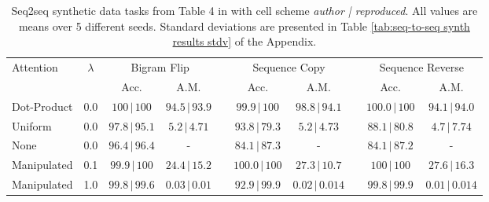 \begin{table}[]
    \caption{Seq2seq synthetic data tasks from Table 4 in \citet{pruthi-etal-2020-learning} with cell scheme \textit{author | reproduced}. All values are means over 5 different seeds. Standard deviations are presented in Table \ref{tab:seq-to-seq synth results stdv} of the Appendix.}
    \label{tab:Authors seq-to-seq synth results}
    \centering
    \begin{tabular}{lccccccccc}
    \toprule
Attention & $\lambda$ & \multicolumn{2}{c}{Bigram Flip} &  & \multicolumn{2}{c}{Sequence Copy} &  & \multicolumn{2}{c}{Sequence Reverse} \\ \cline{3-4} \cline{6-7} \cline{9-10}
                           &                        & \multicolumn{1}{c}{Acc.}           & \multicolumn{1}{c}{A.M.}           &  & \multicolumn{1}{c}{Acc.}            & \multicolumn{1}{c}{A.M.}            &  & \multicolumn{1}{c}{Acc.}              & \multicolumn{1}{c}{A.M.}                    \\
      \midrule
      Dot-Product   & 0.0 & $100\pmb{\,|\,}100$ & $94.5\pmb{\,|\,}93.9$ & & $99.9\pmb{\,|\,}100$ & $98.8\pmb{\,|\,}94.1$ & & $100.0\pmb{\,|\,}100$ & $94.1\pmb{\,|\,}94.0$
      \\
      \midrule
      Uniform   & 0.0 & $97.8\pmb{\,|\,}95.1$ & $5.2\pmb{\,|\,}4.71$ & & $93.8\pmb{\,|\,}79.3$ & $5.2\pmb{\,|\,}4.73$ & & $88.1\pmb{\,|\,}80.8$ & $4.7\pmb{\,|\,}7.74$
      \\
      None   & 0.0 & $96.4\pmb{\,|\,}96.4$ & - & & $84.1\pmb{\,|\,}87.3$ & - & & $84.1\pmb{\,|\,}87.2$ & -
      \\
      \midrule
      Manipulated   & 0.1 & $99.9\pmb{\,|\,}100$ & $24.4\pmb{\,|\,}15.2$ & & $100.0\pmb{\,|\,}100$ & $27.3\pmb{\,|\,}10.7$ & & $100\pmb{\,|\,}100$ & $27.6\pmb{\,|\,}16.3$
      \\
      Manipulated   & 1.0 & $99.8\pmb{\,|\,}99.6$ & $0.03\pmb{\,|\,}0.01$ & & $92.9\pmb{\,|\,}99.9$ & $0.02\pmb{\,|\,}0.014$ & & $99.8\pmb{\,|\,}99.9$ & $0.01\pmb{\,|\,}0.014$
    \\
    \bottomrule
    \end{tabular}
\end{table}

